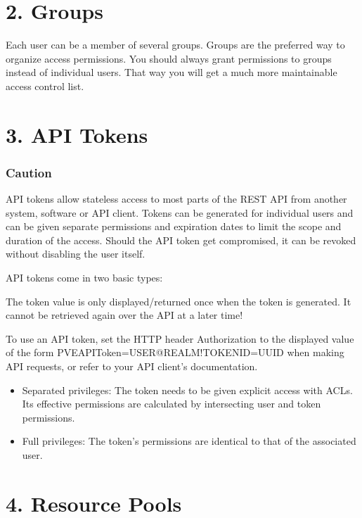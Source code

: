 \section{2. Groups}

Each user can be a member of several groups. Groups are the preferred way to organize access permissions. You should always grant permissions to groups instead of individual users. That way you will get a much more maintainable access control list.


\section{3. API Tokens}

\subsubsection{Caution}

API tokens allow stateless access to most parts of the REST API from another system, software or API client. Tokens can be generated for individual users and can be given separate permissions and expiration dates to limit the scope and duration of the access. Should the API token get compromised, it can be revoked without disabling the user itself.

API tokens come in two basic types:

The token value is only displayed/returned once when the token is generated. It cannot be retrieved again over the API at a later time!

To use an API token, set the HTTP header Authorization to the displayed value of the form PVEAPIToken=USER@REALM!TOKENID=UUID when making API requests, or refer to your API client’s documentation.

\begin{itemize}[leftmargin=2cm]

	\item Separated privileges: The token needs to be given explicit access with ACLs. Its effective permissions are calculated by intersecting user and token permissions.

	\item Full privileges: The token’s permissions are identical to that of the associated user.

\end{itemize}


\section{4. Resource Pools}

